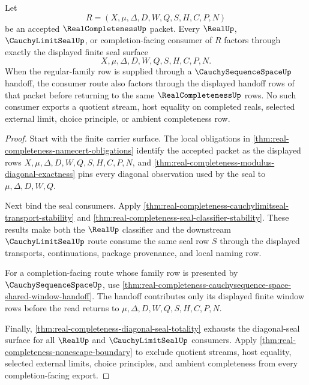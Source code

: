 \begin{theorem}
\label{thm:real-completeness-scoped-consumer-seal-exhaustion}
Let
$$
R=(X,\mu,\Delta,D,W,Q,S,H,C,P,N)
$$
be an accepted $\RealCompletenessUp$ packet. Every $\RealUp$, $\CauchyLimitSealUp$, or completion-facing consumer of $R$ factors through exactly the displayed finite seal surface
$$
X,\mu,\Delta,D,W,Q,S,H,C,P,N.
$$
When the regular-family row is supplied through a $\CauchySequenceSpaceUp$ handoff, the consumer route also factors through the displayed handoff rows of that packet before returning to the same $\RealCompletenessUp$ rows. No such consumer exports a quotient stream, host equality on completed reals, selected external limit, choice principle, or ambient completeness row.
\end{theorem}
\begin{proof}
Start with the finite carrier surface. The local obligations in \autoref{thm:real-completeness-namecert-obligations} identify the accepted packet as the displayed rows $X,\mu,\Delta,D,W,Q,S,H,C,P,N$, and \autoref{thm:real-completeness-modulus-diagonal-exactness} pins every diagonal observation used by the seal to $\mu,\Delta,D,W,Q$.

Next bind the seal consumers. Apply \autoref{thm:real-completeness-cauchylimitseal-transport-stability} and \autoref{thm:real-completeness-seal-classifier-stability}. These results make both the $\RealUp$ classifier and the downstream $\CauchyLimitSealUp$ route consume the same seal row $S$ through the displayed transports, continuations, package provenance, and local naming row.

For a completion-facing route whose family row is presented by $\CauchySequenceSpaceUp$, use \autoref{thm:real-completeness-cauchysequence-space-shared-window-handoff}. The handoff contributes only its displayed finite window rows before the read returns to $\mu,\Delta,D,W,Q,S,H,C,P,N$.

Finally, \autoref{thm:real-completeness-diagonal-seal-totality} exhausts the diagonal-seal surface for all $\RealUp$ and $\CauchyLimitSealUp$ consumers. Apply \autoref{thm:real-completeness-nonescape-boundary} to exclude quotient streams, host equality, selected external limits, choice principles, and ambient completeness from every completion-facing export.
\end{proof}


